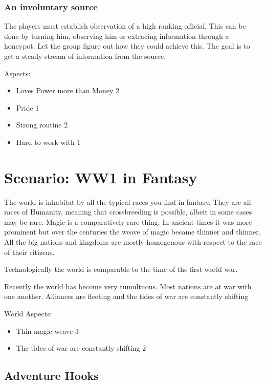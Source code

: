 \documentclass[11pt]{article}
\begin{document}
{\subsubsection{An involuntary source}
\label{sec:org61e3e56}

The players must establish observation of a high ranking official. This can be done by turning him, observing him or extracing information through a honeypot. Let the group figure out how they could achieve this. The goal is to get a steady stream of information from the source.

Aspects:
\begin{itemize}
\item Loves Power more than Money 2
\item Pride 1
\item Strong routine 2
\item Hard to work with 1
\end{itemize}

\section{Scenario: WW1 in Fantasy}
\label{sec:org024f8ff}

The world is inhabitat by all the typical races you find in fantasy. They are all races of Humanity, meaning that crossbreeding is possible, albeit in some cases may be rare. Magic is a comparatively rare thing. In ancient times it was more prominent but over the centuries the weave of magic became thinner and thinner. All the big nations and kingdoms are mostly homogenous with respect to the race of their citizens. 

Technologically the world is comparable to the time of the first world war. 

Recently the world has become very tumultuous. Most nations are at war with one another. Alliances are fleeting and the tides of war are constantly shifting

World Aspects:
\begin{itemize}
\item Thin magic weave 3
\item The tides of war are constantly shifting 2
\end{itemize}


\subsection{Adventure Hooks}
\label{sec:orgf3bafd7}

}
\end{document}
